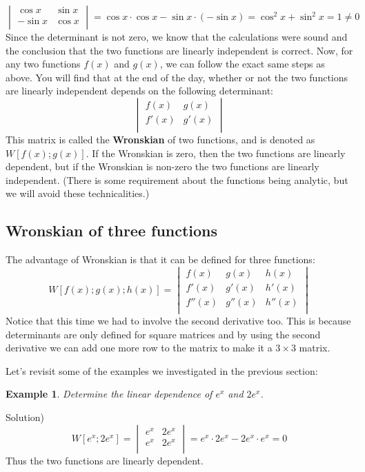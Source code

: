 \documentclass[12pt]{report}
\newtheorem{ex}{Example}[section]
\begin{document}
$$\begin{vmatrix} \cos x & \sin x \\ -\sin x & \cos x \\ \end{vmatrix} = \cos x \cdot \cos x - \sin x \cdot (-\sin x) = \cos^2 x + \sin^2 x =1 \neq 0 $$
Since the determinant is not zero, we know that the calculations were sound and the conclusion that the two functions are linearly independent is correct.
Now, for any two functions $f(x)$ and $g(x)$, we can follow the exact same steps as above. You will find that at the end of the day, whether or not the two functions are linearly independent depends on the following determinant:
$$\begin{vmatrix} f(x) & g(x) \\ f'(x) & g'(x) \\ \end{vmatrix}$$
This matrix is called the \textbf{Wronskian} of two functions, and is denoted as $W[ f(x); g(x) ]$. If the Wronskian is zero, then the two functions are linearly dependent, but if the Wronskian is non-zero the two functions are linearly independent. (There is some requirement about the functions being analytic, but we will avoid these technicalities.)

\subsection*{Wronskian of three functions}
The advantage of Wronskian is that it can be defined for three functions:
$$W[f(x); g(x); h(x)] = \begin{vmatrix} f(x) & g(x) & h(x) \\ f'(x) & g'(x)& h'(x) \\ f''(x) & g''(x)& h''(x) \\ \end{vmatrix}$$
Notice that this time we had to involve the second derivative too. This is because determinants are only defined for square matrices and by using the second derivative we can add one more row to the matrix to make it a $3\times3$ matrix.

Let's revisit some of the examples we investigated in the previous section:
\begin{ex}
Determine the linear dependence of $e^x$ and $2e^x$.
\end{ex}
Solution)
$$W[e^x ; 2 e^x ] = \begin{vmatrix} e^x & 2e^x  \\ e^x  & 2e^x  \\ \end{vmatrix} = e^x\cdot 2e^x - 2e^x\cdot e^x = 0$$
Thus the two functions are linearly dependent.
\end{document}

